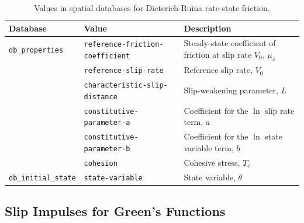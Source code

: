 \begin{table}[htbp]
\caption{Values in spatial databases for Dieterich-Ruina rate-state friction.}
\label{tab:rate:state:ageing:properties:statevars}
\begin{tabular}{llp{2.5in}}
\textbf{Database} & \textbf{Value} & \textbf{Description}\\
\hline 
\texttt{db\_properties} & \texttt{reference-friction-coefficient} & Steady-state coefficient of friction at slip rate $V_{0}$, $\mu_{s}$\\
 & \texttt{reference-slip-rate} & Reference slip rate, $V_{0}$\\
 & \texttt{characteristic-slip-distance} & Slip-weakening parameter, $L$\\
 & \texttt{constitutive-parameter-a} & Coefficient for the $\ln$ slip rate term, $a$\\
 & \texttt{constitutive-parameter-b} & Coefficient for the $\ln$ state variable term, $b$\\
 & \texttt{cohesion} & Cohesive stress, $T_{c}$\\
\texttt{db\_initial\_state} & \texttt{state-variable} & State variable, $\theta$\\
\hline 
\end{tabular}
\end{table}


\subsection{Slip Impulses for Green's Functions}
\label{sec:fault:cohesive:impulses}

